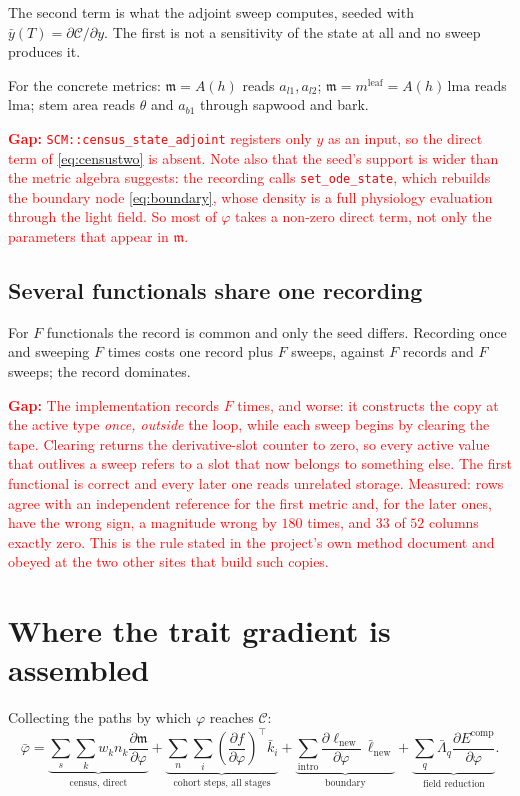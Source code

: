 \documentclass[11pt,a4paper]{article}
\newcommand{\code}[1]{\texttt{\small #1}}
\newcommand{\adj}[1]{\bar{#1}}
\newcommand{\dd}[2]{\frac{\partial #1}{\partial #2}}
\newcommand{\gap}[1]{\textcolor{red}{\textbf{Gap:} #1}}
\begin{document}
The second term is what the adjoint sweep computes, seeded with
$\adj y(T) = \partial \mathcal{C}/\partial y$. The first is not a sensitivity of
the state at all and no sweep produces it.

For the concrete metrics: $\mathfrak{m} = A(h)$ reads $a_{l1}, a_{l2}$;
$\mathfrak{m} = m^{\text{leaf}} = A(h)\,\mathrm{lma}$ reads $\mathrm{lma}$;
stem area reads $\theta$ and $a_{b1}$ through sapwood and bark.

\gap{\code{SCM::census\_state\_adjoint} registers only $y$ as an input, so the
direct term of \eqref{eq:censustwo} is absent. Note also that the seed's support
is wider than the metric algebra suggests: the recording calls
\code{set\_ode\_state}, which rebuilds the boundary node \eqref{eq:boundary},
whose density is a full physiology evaluation through the light field. So most of
$\varphi$ takes a non-zero direct term, not only the parameters that appear in
$\mathfrak{m}$.}

\subsection{Several functionals share one recording}

For $F$ functionals the record is common and only the seed differs. Recording
once and sweeping $F$ times costs one record plus $F$ sweeps, against $F$ records
and $F$ sweeps; the record dominates.

\gap{The implementation records $F$ times, and worse: it constructs the copy at
the active type \emph{once, outside} the loop, while each sweep begins by clearing
the tape. Clearing returns the derivative-slot counter to zero, so every active
value that outlives a sweep refers to a slot that now belongs to something else.
The first functional is correct and every later one reads unrelated storage.
Measured: rows agree with an independent reference for the first metric and, for
the later ones, have the wrong sign, a magnitude wrong by $180$ times, and $33$ of
$52$ columns exactly zero. This is the rule stated in the project's own method
document and obeyed at the two other sites that build such copies.}

\section{Where the trait gradient is assembled}

Collecting the paths by which $\varphi$ reaches $\mathcal{C}$:
\begin{equation}
\adj\varphi =
\underbrace{\sum_s\sum_k w_k n_k \dd{\mathfrak{m}}{\varphi}}_{\text{census, direct}}
+ \underbrace{\sum_n \sum_i \left(\dd{f}{\varphi}\right)^{\!\top}\!\adj k_i}
  _{\text{cohort steps, all stages}}
+ \underbrace{\sum_{\text{intro}} \dd{\ell_{\text{new}}}{\varphi}\,\adj\ell_{\text{new}}}
  _{\text{boundary}}
+ \underbrace{\sum_q \adj\Lambda_q \dd{E^{\mathrm{comp}}}{\varphi}}
  _{\text{field reduction}} .
\label{eq:assemble}
\end{equation}
\end{document}
